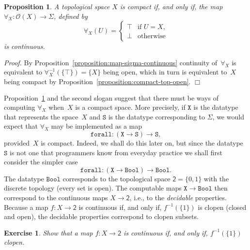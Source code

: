 \documentclass[a4paper,10pt]{article}
\newtheorem{proposition}[theorem]{Proposition}
\newtheorem{exercise}[theorem]{Exercise}
\newenvironment{proof}{\par\noindent\textit{Proof.}}{\hfill$\Box$\par\medskip}
\newcommand{\set}[1]{\{#1\}}
\newcommand{\tpl}[1]{\mathcal{O}(#1)}
\newcommand{\two}{\mathsf{2}}
\newcommand{\Bool}{\mathtt{Bool}}
\begin{document}
\begin{proposition}
  \label{proposition:compact-iff-forall-continuous}
  A topological space $X$ is compact if, and only if, the map
  $\forall_X : \tpl{X} \to \Sigma$, defined by
  \begin{equation*}
    \forall_X(U) =
    \begin{cases}
      \top & \text{if $U = X$,}\\
      \bot & \text{otherwise}
    \end{cases}    
  \end{equation*}
  is continuous.
\end{proposition}

\begin{proof}
  By Proposition~\ref{proposition:map-sigma-continuous} continuity
  of~$\forall_X$ is equivalent to $\forall_X^{-1}(\set{\top}) =
  \set{X}$ being open, which in turn is equivalent to~$X$ being
  compact by Proposition~\ref{proposition:compact-top-open}.
\end{proof}

Proposition~\ref{proposition:compact-iff-forall-continuous} and the
second slogan suggest that there must be ways of computing $\forall_X$
when~$X$ is a compact space. More precisely, if $\mathtt{X}$ is the
datatype that represents the space~$X$ and $\mathtt{S}$ is the
datatype corresponding to $\Sigma$, we would expect that $\forall_X$
may be implemented as a map
%
\begin{equation*}
  \mathtt{forall} : (\mathtt{X} \to \mathtt{S}) \to \mathtt{S},
\end{equation*}
%
provided~$X$ is compact. Indeed, we shall do this later on, but since
the datatype $\mathtt{S}$ is not one that programmers know from
everyday practice we shall first consider the simpler case
%
\begin{equation}
  \label{eq:forall-bool}
  \mathtt{forall} : (\mathtt{X} \to \Bool) \to \Bool.
\end{equation}
%
The datatype $\Bool$ corresponds to the topological space
$\two = \set{0, 1}$ with the discrete topology (every set is open).
The computable maps $\mathtt{X} \to \Bool$ then correspond to
the continuous maps $X \to \two$, i.e., to the \emph{decidable}
properties. Because a map $f : X \to \two$ is continuous if, and only
if, $f^{-1}(\set{1})$ is clopen (closed and open), the decidable
properties correspond to clopen subsets.

\begin{exercise}
  Show that a map $f : X \to \two$ is continuous if, and only if,
  $f^{-1}(\set{1})$ clopen.
\end{exercise}
\end{document}
